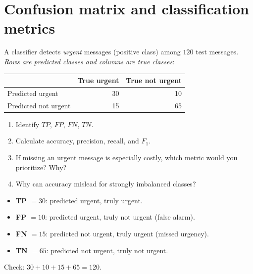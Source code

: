\section{Confusion matrix and classification metrics}
\label{sec:ex15}
\begin{problem}
A classifier detects \emph{urgent} messages (positive class) among $120$ test messages. \emph{Rows are predicted classes and columns are true classes}:
\begin{center}\begin{tabular}{@{}lrr@{}}\toprule &True urgent&True not urgent\\\midrule Predicted urgent&30&10\\Predicted not urgent&15&65\\\bottomrule\end{tabular}\end{center}
\begin{enumerate}[label=\textbf{(\alph*)}]
\item Identify $TP$, $FP$, $FN$, $TN$.
\item Calculate accuracy, precision, recall, and $F_1$.
\item If missing an urgent message is especially costly, which metric would you prioritize? Why?
\item Why can accuracy mislead for strongly imbalanced classes?
\end{enumerate}
\end{problem}

\begin{itemize}
\item \textbf{TP $=30$}: predicted urgent, truly urgent.
\item \textbf{FP $=10$}: predicted urgent, truly not urgent (false alarm).
\item \textbf{FN $=15$}: predicted not urgent, truly urgent (missed urgency).
\item \textbf{TN $=65$}: predicted not urgent, truly not urgent.
\end{itemize}
Check: $30+10+15+65=120$.

